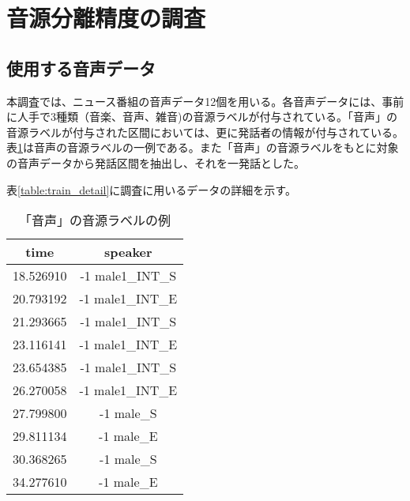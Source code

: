 \section{音源分離精度の調査}
\subsection{使用する音声データ}
\label{section:detail_train_news}
本調査では、ニュース番組の音声データ12個を用いる。各音声データには、事前に人手で3種類（音楽、音声、雑音)の音源ラベルが付与されている。「音声」の音源ラベルが付与された区間においては、更に発話者の情報が付与されている。表\ref{fig:example_label}は音声の音源ラベルの一例である。また「音声」の音源ラベルをもとに対象の音声データから発話区間を抽出し、それを一発話とした。\par
表\ref{table:train_detail}に調査に用いるデータの詳細を示す。\vspace{0.2in}

\begin{table}[H]
\begin{center}
\caption{「音声」の音源ラベルの例 \label{fig:example_label}}
\begin{tabular}{|c|c|}
\hline
time      & speaker          \\ \hline
18.526910 & -1 male1\_INT\_S \\ \hline
20.793192 & -1 male1\_INT\_E \\ \hline
21.293665 & -1 male1\_INT\_S \\ \hline
23.116141 & -1 male1\_INT\_E \\ \hline
23.654385 & -1 male1\_INT\_S \\ \hline
26.270058 & -1 male1\_INT\_E \\ \hline
27.799800 & -1 male\_S       \\ \hline
29.811134 & -1 male\_E       \\ \hline
30.368265 & -1 male\_S       \\ \hline
34.277610 & -1 male\_E       \\ \hline
\end{tabular}
\end{center}
\end{table}

